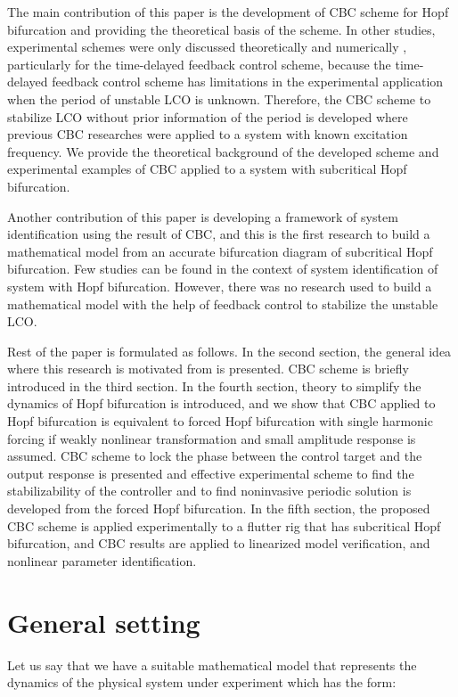 \documentclass[openacc]{rsproca_new}%
\begin{document}
The main contribution of this paper is the development of CBC scheme for Hopf bifurcation and providing the theoretical basis of the scheme. In other studies, experimental schemes were only discussed theoretically and numerically \cite{brown2011time,postlethwaite2013feedback}, particularly for the time-delayed feedback control scheme, because the time-delayed feedback control scheme has limitations in the experimental application when the period of unstable LCO is unknown. Therefore, the CBC scheme to stabilize LCO without prior information of the period is developed where previous CBC researches were applied to a system with known excitation frequency. We provide the theoretical background of the developed scheme and experimental examples of CBC applied to a system with subcritical Hopf bifurcation.

Another contribution of this paper is developing a framework of system identification using the result of CBC, and this is the first research to build a mathematical model from an accurate bifurcation diagram of subcritical Hopf bifurcation. Few studies \cite{abdelkefi2013analytical,thothadri2005nonlinear} can be found in the context of system identification of system with Hopf bifurcation. However, there was no research used to build a mathematical model with the help of feedback control to stabilize the unstable LCO.

Rest of the paper is formulated as follows. In the second section, the general idea where this research is motivated from is presented. CBC scheme is briefly introduced in the third section. In the fourth section, theory to simplify the dynamics of Hopf bifurcation is introduced, and we show that CBC applied to Hopf bifurcation is equivalent to forced Hopf bifurcation with single harmonic forcing if weakly nonlinear transformation and small amplitude response is assumed. CBC scheme to lock the phase between the control target and the output response is presented and effective experimental scheme to find the stabilizability of the controller and to find noninvasive periodic solution is developed from the forced Hopf bifurcation. In the fifth section, the proposed CBC scheme is applied experimentally to a flutter rig that has subcritical Hopf bifurcation, and CBC results are applied to linearized model verification, and nonlinear parameter identification.

\section{General setting}\label{GS}
Let us say that we have a suitable mathematical model that represents the dynamics of the physical system under experiment which has the form:
\end{document}
